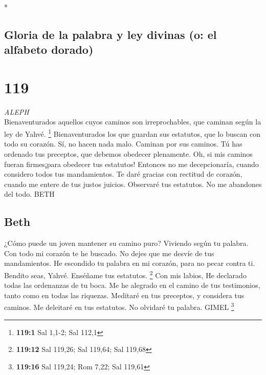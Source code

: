 \begin{paracol}{2}
\begin{otherlanguage}{english}
\end{otherlanguage}

\switchcolumn[0]*

\hypertarget{gloria-de-la-palabra-y-ley-divinas-o-el-alfabeto-dorado}{%
\subsection{Gloria de la palabra y ley divinas (o: el alfabeto
dorado)}\label{gloria-de-la-palabra-y-ley-divinas-o-el-alfabeto-dorado}}

\hypertarget{section-236}{%
\section{119}\label{section-236}}

\emph{ALEPH}\\
 Bienaventurados aquellos cuyos caminos son
irreprochables, que caminan según la ley de Yahvé. \footnote{\textbf{119:1}
  Sal 1,1-2; Sal 112,1}  Bienaventurados los que guardan
sus estatutos, que lo buscan con todo su corazón.  Sí, no
hacen nada malo. Caminan por sus caminos.  Tú has ordenado
tus preceptos, que debemos obedecer plenamente.  Oh, si
mis caminos fueran firmes¡para obedecer tus estatutos! 
Entonces no me decepcionaría, cuando considero todos tus mandamientos.
 Te daré gracias con rectitud de corazón, cuando me entere
de tus justos juicios.  Observaré tus estatutos. No me
abandones del todo. BETH

\hypertarget{beth}{%
\subsection{Beth}\label{beth}}

 ¿Cómo puede un joven mantener su camino puro? Viviendo
según tu palabra.  Con todo mi corazón te he buscado. No
dejes que me desvíe de tus mandamientos.  He escondido tu
palabra en mi corazón, para no pecar contra ti.  Bendito
seas, Yahvé. Enséñame tus estatutos. \footnote{\textbf{119:12} Sal
  119,26; Sal 119,64; Sal 119,68}  Con mis labios, He
declarado todas las ordenanzas de tu boca.  Me he
alegrado en el camino de tus testimonios, tanto como en todas las
riquezas.  Meditaré en tus preceptos, y considera tus
caminos.  Me deleitaré en tus estatutos. No olvidaré tu
palabra. GIMEL \footnote{\textbf{119:16} Sal 119,24; Rom 7,22; Sal
  119,61}


\end{paracol}
